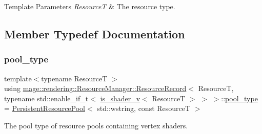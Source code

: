 \begin{DoxyTemplParams}{Template Parameters}
{\em ResourceT} & The resource type. \\
\hline
\end{DoxyTemplParams}


\subsection{Member Typedef Documentation}
\mbox{\label{structmage_1_1rendering_1_1_resource_manager_1_1_resource_record_3_01_resource_t_00_01typename_09b062ee4b0394619806084252c69f48d_a1c01c03fc944bfdd0ab9c135770df401}} 
\subsubsection{\texorpdfstring{pool\+\_\+type}{pool\_type}}
{\footnotesize\ttfamily template$<$typename ResourceT $>$ \\
using \mbox{\hyperlink{structmage_1_1rendering_1_1_resource_manager_1_1_resource_record}{mage\+::rendering\+::\+Resource\+Manager\+::\+Resource\+Record}}$<$ ResourceT, typename std\+::enable\+\_\+if\+\_\+t$<$ \mbox{\hyperlink{namespacemage_1_1rendering_a31fdbf9c96bd42e878e844c2b32b2fb9}{is\+\_\+shader\+\_\+v}}$<$ ResourceT $>$ $>$ $>$\+::\mbox{\hyperlink{structmage_1_1rendering_1_1_resource_manager_1_1_resource_record_3_01_resource_t_00_01typename_09b062ee4b0394619806084252c69f48d_a1c01c03fc944bfdd0ab9c135770df401}{pool\+\_\+type}} =  \mbox{\hyperlink{classmage_1_1_persistent_resource_pool}{Persistent\+Resource\+Pool}}$<$ std\+::wstring, const ResourceT $>$}

The pool type of resource pools containing vertex shaders. 